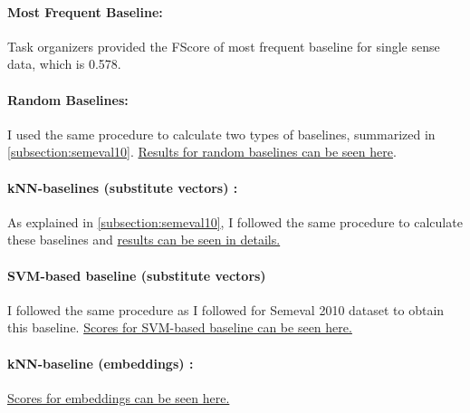 \paragraph{Most Frequent Baseline:} Task organizers provided the FScore of most frequent baseline for single sense data, which is 0.578.
\paragraph{Random Baselines:} I used the same procedure to calculate two types of baselines, summarized in \ref{subsection:semeval10}.  \href{http://goo.gl/f2X0da}{Results for random baselines can be seen here}.
\paragraph{kNN-baselines (substitute vectors) :} As explained in \ref{subsection:semeval10}, I followed the same procedure to calculate these baselines and \href{http://goo.gl/J88G7R}{results can be seen in details.}
\paragraph{SVM-based baseline (substitute vectors)} I followed the same procedure as I followed for Semeval 2010 dataset to obtain this baseline. \href{https://goo.gl/010sp5}{Scores for SVM-based baseline can be seen here.}
\paragraph{kNN-baseline (embeddings) :} \href{https://goo.gl/c8F92N}{Scores for embeddings can be seen here.} 

 
